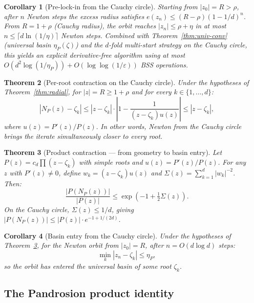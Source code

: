 \documentclass[11pt,a4paper]{article}
\newtheorem{theorem}{Theorem}[section]
\newtheorem{corollary}[theorem]{Corollary}
\begin{document}
\begin{corollary}[Pre-lock-in from the Cauchy circle]
Starting from $|z_0| = R > \rho$, after $n$ Newton steps the excess radius satisfies $e(z_n) \le (R - \rho)(1 - 1/d)^n$. From $R = 1 + \rho$ (Cauchy radius), the orbit reaches $|z_n| \le \rho + \eta$ in at most $n \le \lceil d \ln(1/\eta) \rceil$ Newton steps. Combined with Theorem~\ref{thm:univ-conv} (universal basin $\eta_P(\zeta)$) and the $d$-fold multi-start strategy on the Cauchy circle, this yields an explicit derivative-free algorithm using at most $O(d^2 \log(1/\eta_P)) + O(\log\log(1/\varepsilon))$ BSS operations.
\end{corollary}

\begin{theorem}[Per-root contraction on the Cauchy circle]\label{thm:per-root}
Under the hypotheses of Theorem~\ref{thm:radial}, for $|z| = R \ge 1 + \rho$ and for \emph{every} $k \in \{1, \dots, d\}$:
\begin{equation}
|N_P(z) - \zeta_k| \le |z - \zeta_k| \cdot \left| 1 - \frac{1}{(z - \zeta_k) u(z)} \right| \le |z - \zeta_k|,
\end{equation}
where $u(z) = P'(z)/P(z)$. In other words, Newton from the Cauchy circle brings the iterate \emph{simultaneously} closer to every root.
\end{theorem}

\begin{theorem}[Product contraction --- from geometry to basin entry]\label{thm:product-contr}
Let $P(z) = c_d \prod (z - \zeta_k)$ with simple roots and $u(z) = P'(z)/P(z)$. For any $z$ with $P'(z) \ne 0$, define $w_k = (z - \zeta_k) u(z)$ and $\Sigma(z) = \sum_{k=1}^d |w_k|^{-2}$. Then:
\begin{equation}
\frac{|P(N_P(z))|}{|P(z)|} \le \exp\!\left( -1 + \tfrac{1}{2} \Sigma(z) \right).
\end{equation}
On the Cauchy circle, $\Sigma(z) \le 1/d$, giving $|P(N_P(z))| \le |P(z)| \cdot e^{-1 + 1/(2d)}$.
\end{theorem}

\begin{corollary}[Basin entry from the Cauchy circle]
Under the hypotheses of Theorem~\ref{thm:product-contr}, for the Newton orbit from $|z_0| = R$, after $n = O(d \log d)$ steps:
$$ \min_k |z_n - \zeta_k| \le \eta_P, $$
so the orbit has entered the universal basin of some root $\zeta_k$.
\end{corollary}

\subsection{The Pandrosion product identity}
\end{document}
